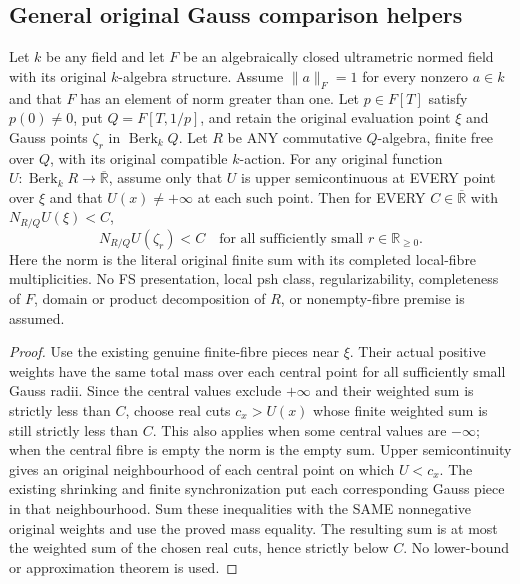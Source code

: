 \subsection{General original Gauss comparison helpers}

\begin{lemma}
\label{lem:nf-general-gauss-usc-upper}
\leanok
{}
Let $k$ be any field and let $F$ be an algebraically closed ultrametric
normed field with its original $k$-algebra structure. Assume
$\|a\|_F=1$ for every nonzero $a\in k$ and that $F$ has an element of
norm greater than one. Let $p\in F[T]$ satisfy $p(0)\ne0$, put
$Q=F[T,1/p]$, and retain the original evaluation point $\xi$ and
Gauss points $\zeta_r$ in $\operatorname{Berk}_k Q$.
Let $R$ be ANY commutative $Q$-algebra, finite free over $Q$, with
its original compatible $k$-action. For any original function
$U:\operatorname{Berk}_k R\to\overline{\mathbb R}$, assume only that
$U$ is upper semicontinuous at EVERY point over $\xi$ and that
$U(x)\ne+\infty$ at each such point. Then for EVERY
$C\in\overline{\mathbb R}$ with $N_{R/Q}U(\xi)<C$,
\[
 N_{R/Q}U(\zeta_r)<C
 \quad\text{for all sufficiently small }r\in\mathbb R_{\ge0}.
\]
Here the norm is the literal original finite sum with its completed
local-fibre multiplicities. No FS presentation, local psh class,
regularizability, completeness of $F$, domain or product decomposition
of $R$, or nonempty-fibre premise is assumed.
\end{lemma}
\begin{proof}
Use the existing genuine finite-fibre pieces near $\xi$. Their actual
positive weights have the same total mass over each central point for
all sufficiently small Gauss radii. Since the central values exclude
$+\infty$ and their weighted sum is strictly less than $C$, choose
real cuts $c_x>U(x)$ whose finite weighted sum is still strictly less
than $C$. This also applies when some central values are $-\infty$;
when the central fibre is empty the norm is the empty sum.
Upper semicontinuity gives an original neighbourhood of each central
point on which $U<c_x$. The existing shrinking and finite synchronization
put each corresponding Gauss piece in that neighbourhood. Sum these
inequalities with the SAME nonnegative original weights and use the
proved mass equality. The resulting sum is at most the weighted sum
of the chosen real cuts, hence strictly below $C$. No lower-bound or
approximation theorem is used.
\end{proof}

